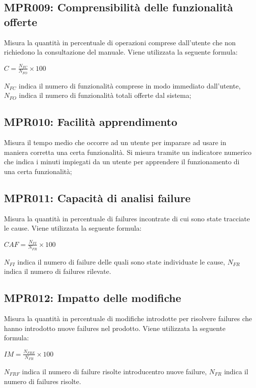\subsection{MPR009: Comprensibilità  delle funzionalità offerte}
Misura la quantità in percentuale di operazioni comprese dall’utente che non richiedono la
consultazione del manuale. Viene utilizzata la seguente formula:
\begin{center}{$C=\frac{N_{FC}}{N_{FO}}\times 100$}\end{center}
${N_{FC}}$ indica il numero di funzionalità comprese in modo immediato dall'utente, ${N_{FO}}$ indica il numero di funzionalità totali offerte dal sistema;
	
\subsection{MPR010: Facilità apprendimento}
Misura il tempo medio che occorre ad un utente per imparare ad usare in maniera corretta
una certa funzionalità. Si misura tramite un indicatore numerico che indica i minuti
impiegati da un utente per apprendere il funzionamento di una certa funzionalità;

\subsection{MPR011: Capacità di analisi failure}
Misura la quantità in percentuale di failures incontrate di cui sono state tracciate le cause. Viene
utilizzata la seguente formula:
\begin{center}{$CAF=\frac{N_{FI}}{N_{FR}}\times 100 $}\end{center}
${N_{FI}}$ indica il numero di failure delle quali sono state individuate le cause, ${N_{FR}}$ indica il numero di failures rilevate.

\subsection{MPR012: Impatto delle modifiche}
Misura la quantità in percentuale di modifiche introdotte per risolvere failures che hanno introdotto nuove failures nel prodotto. Viene utilizzata la seguente formula:
\begin{center}{$IM=\frac{N_{FRE}}{N_{FR}}\times 100 $}\end{center}
${N_{FRF}}$ indica il numero di failure risolte introducentro nuove failure, ${N_{FR}}$ indica il numero di failures risolte.


